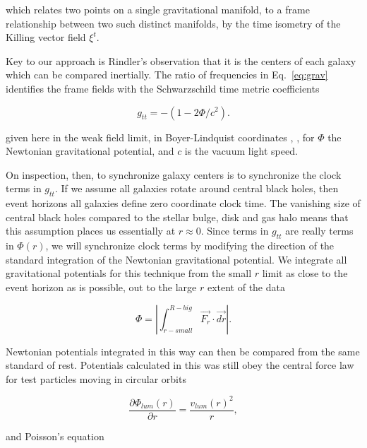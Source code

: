 \documentclass[reprint,%
 amsmath,amssymb,
 aps,
]{revtex4-1}
\begin{document}
    
    which relates two points on a single gravitational manifold,  to   a frame relationship between two such distinct manifolds, by the time isometry of the Killing vector field 
   $\xi^t$.
    
    Key to 
our approach is   Rindler's observation  that it is the centers of each galaxy which can be compared inertially. 
 The ratio of frequencies in Eq.~\ref{eq:grav}   identifies the frame fields with the Schwarzschild time metric coefficients 


  \begin{equation}
      g_{tt}= -( 1 - 2\Phi/ c^2).
      \label{clocktime}
  \end{equation} 
 
  
 given here in the weak field    limit,  in Boyer-Lindquist coordinates \cite{Hartle}, \cite{Wald}, for $\Phi $
 the Newtonian  gravitational potential, and $c$ is the vacuum light speed.  


On inspection, then, to synchronize galaxy centers is to synchronize the clock terms   in $g_{tt}$.   If we  assume  all galaxies rotate around central black holes, then event horizons all galaxies define zero   coordinate clock time. The vanishing size of central black holes compared to  the stellar bulge, disk and gas halo means that this assumption places us essentially at $r\approx 0$. 
Since terms in $g_{tt}$ are really terms in  $\Phi (r)$, we  will synchronize clock terms by modifying the direction of the standard integration of  the Newtonian gravitational potential.    
   We integrate all gravitational potentials for this technique from the small $r$ limit as close to the event horizon as is possible, out  to the large $r$  extent of the data  

 \begin{equation}
      \Phi  = \left| \int^{R-big}_{r-small} \vec{F_r}\cdot\vec{dr} \right|.
      \label{eq:Newt2}
      \end{equation}
 
     Newtonian potentials integrated in this way  can then be compared from the same standard of rest. 
     Potentials calculated in this was still obey the central force law for test particles moving in circular orbits

\begin{equation}
 \frac{\partial \Phi_{lum}(r)}{\partial r}    =\frac{v_{lum}(r)^2}{r},  
    \label{zoochance1}
\end{equation}

 and Poisson's equation
 
\end{document}
